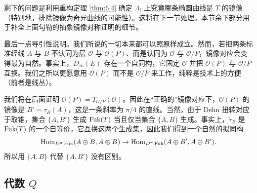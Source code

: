 剩下的问题是利用重构定理 \ref{thm:6.4} 确定 $\Lambda_t$ 上究竟哪条椭圆曲线是 $T$ 的镜像（特别地，排除镜像为奇异曲线的可能性）。这将在下一节处理。本节余下部分用于补全上面勾勒的抽象镜像对称证明的细节。

最后一点导引性说明。我们所说的一切本来都可以照原样成立。然而，若把两条标准经线 $A$ 与 $B$ 不认同为层 $\mathcal{O}$ 与 $\mathcal{O}(P)$、而是认同为 $\mathcal{O}$ 与 $\mathcal{O}/P$，镜像对应会变得最为自然。事实上，$D_\infty(E)$ 存在一个自同构，它固定 $\mathcal{O}$ 并把 $\mathcal{O}(P)$ 与 $\mathcal{O}/P$ 互换。我们之所以更愿意用 $\mathcal{O}(P)$ 而不是 $\mathcal{O}/P$ 来工作，纯粹是技术上的方便（前者是线丛）。

我们将在后面证明 $\mathcal{O}(P)=T_{\mathcal{O}/P}(\mathcal{O})$。因此在“正确的”镜像对应下，$\mathcal{O}(P)$ 的镜像是 $B'=\tau_B(A)$，这是一条斜率为 $\pi/4$ 的直线。当然，由于 Dehn 扭转对应于取锥，集合 $\{A,B'\}$ 生成 $\operatorname{Fuk}(T)$ 当且仅当集合 $\{A,B\}$ 生成。事实上，$\tilde\tau_B$ 是 $\operatorname{Fuk}(T)$ 的一个自等价，它互换这两个生成集，因此我们得到一个自然的拟同构
\[
\operatorname{Hom}_{D^\pi\operatorname{Fuk}}(A\oplus B,A\oplus B)\to\operatorname{Hom}_{D^\pi\operatorname{Fuk}}(A\oplus B',A\oplus B').
\]
所以用 $\{A,B\}$ 代替 $\{A,B'\}$ 没有区别。


\subsection{\texorpdfstring{代数 $Q$}{代数 Q}}\label{subsec:algebra-Q}

